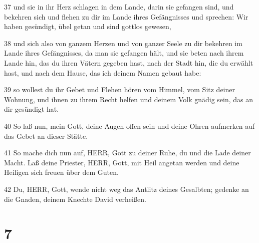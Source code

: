 \par 37 und sie in ihr Herz schlagen in dem Lande, darin sie gefangen sind, und bekehren sich und flehen zu dir im Lande ihres Gefängnisses und sprechen: Wir haben gesündigt, übel getan und sind gottlos gewesen,
\par 38 und sich also von ganzem Herzen und von ganzer Seele zu dir bekehren im Lande ihres Gefängnisses, da man sie gefangen hält, und sie beten nach ihrem Lande hin, das du ihren Vätern gegeben hast, nach der Stadt hin, die du erwählt hast, und nach dem Hause, das ich deinem Namen gebaut habe:
\par 39 so wollest du ihr Gebet und Flehen hören vom Himmel, vom Sitz deiner Wohnung, und ihnen zu ihrem Recht helfen und deinem Volk gnädig sein, das an dir gesündigt hat.
\par 40 So laß nun, mein Gott, deine Augen offen sein und deine Ohren aufmerken auf das Gebet an dieser Stätte.
\par 41 So mache dich nun auf, HERR, Gott zu deiner Ruhe, du und die Lade deiner Macht. Laß deine Priester, HERR, Gott, mit Heil angetan werden und deine Heiligen sich freuen über dem Guten.
\par 42 Du, HERR, Gott, wende nicht weg das Antlitz deines Gesalbten; gedenke an die Gnaden, deinem Knechte David verheißen.

\chapter{7}

